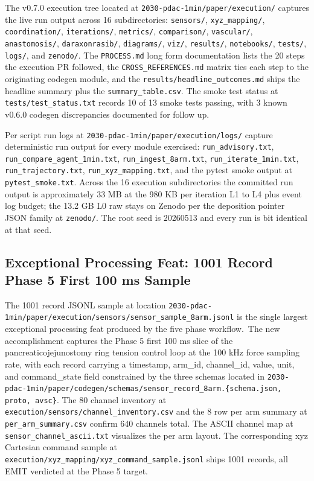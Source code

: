 The v0.7.0 execution tree located at
\texttt{2030-pdac-1min/paper/execution/} captures the live run
output across 16 subdirectories: \texttt{sensors/},
\texttt{xyz_mapping/}, \texttt{coordination/}, \texttt{iterations/},
\texttt{metrics/}, \texttt{comparison/}, \texttt{vascular/},
\texttt{anastomosis/}, \texttt{daraxonrasib/}, \texttt{diagrams/},
\texttt{viz/}, \texttt{results/}, \texttt{notebooks/},
\texttt{tests/}, \texttt{logs/}, and \texttt{zenodo/}. The
\texttt{PROCESS.md} long form documentation lists the 20 steps the
execution PR followed, the \texttt{CROSS_REFERENCES.md} matrix
ties each step to the originating codegen module, and the
\texttt{results/headline_outcomes.md} ships the headline summary
plus the \texttt{summary_table.csv}. The smoke test status at
\texttt{tests/test_status.txt} records 10 of 13 smoke tests
passing, with 3 known v0.6.0 codegen discrepancies documented for
follow up.

Per script run logs at \texttt{2030-pdac-1min/paper/execution/logs/}
capture deterministic run output for every module exercised:
\texttt{run_advisory.txt}, \texttt{run_compare_agent_1min.txt},
\texttt{run_ingest_8arm.txt}, \texttt{run_iterate_1min.txt},
\texttt{run_trajectory.txt}, \texttt{run_xyz_mapping.txt}, and the
pytest smoke output at \texttt{pytest_smoke.txt}. Across the 16
execution subdirectories the committed run output is approximately
33 MB at the 980 KB per iteration L1 to L4 plus event log budget;
the 13.2 GB L0 raw stays on Zenodo per the deposition pointer
JSON family at \texttt{zenodo/}. The root seed is 20260513 and
every run is bit identical at that seed.

\subsection{Exceptional Processing Feat: 1001 Record Phase 5 First 100 ms Sample}
\label{sec:results-feat}

The 1001 record JSONL sample at location
\texttt{2030-pdac-1min/paper/execution/sensors/sensor_sample_8arm.jsonl}
is the single largest exceptional processing feat produced by the
five phase workflow.\ The new accomplishment captures the Phase 5 first 100 ms slice
of the pancreaticojejunostomy ring tension control loop at the
100 kHz force sampling rate, with each record carrying a
timestamp, arm_id, channel_id, value, unit, and command_state
field constrained by the three schemas located in
\texttt{2030-pdac-1min/paper/codegen/schemas/sensor_record_8arm.\{schema.json, proto, avsc\}}.
The 80 channel inventory at
\texttt{execution/sensors/channel_inventory.csv} and the 8 row
per arm summary at \texttt{per_arm_summary.csv} confirm 640
channels total. The ASCII channel map at
\texttt{sensor_channel_ascii.txt} visualizes the per arm layout.
The corresponding xyz Cartesian command sample at
\texttt{execution/xyz_mapping/xyz_command_sample.jsonl} ships 1001
records, all EMIT verdicted at the Phase 5 target.

